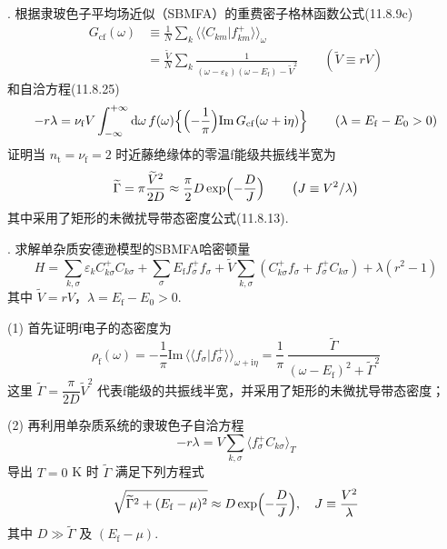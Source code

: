 {.} 根据隶玻色子平均场近似（SBMFA）的重费密子格林函数公式(11.8.9c)
\begin{equation*}
\begin{aligned}
  G_{\mathrm{cf}}(\omega)&\equiv\frac{1}{N}\sum_{k}
  \langle\langle C_{km}|f^{+}_{km}\rangle\rangle_{\omega}\\
  &=\frac{\widetilde{V}}{N}\sum_{k}
  \frac{1}{(\omega-\varepsilon_{k})(\omega-E_{\mathrm{f}})-\widetilde{V}^{2}}
  \qquad\left(\widetilde{V}\equiv rV\right)
\end{aligned}
\end{equation*}
和自洽方程(11.8.25)
\begin{equation*}
  -r\lambda=\nu_{\mathrm{f}}V\int_{-\infty}^{+\infty}\mathrm{d}\omega\,f(\omega)
  \Bigl\{\Bigl(-\frac{1}{\pi}\Bigr)\mathrm{Im}\,G_{\mathrm{cf}}(\omega+\mathrm{i}\eta)\Bigr\}
  \qquad\left(\lambda=E_{\mathrm{f}}-E_{0}>0\right)
\end{equation*}
证明当 $n_{\mathrm{t}}=\nu_{\mathrm{f}}=2$ 时近藤绝缘体的零温f能级共振线半宽为
\begin{equation*}
  \widetilde{\Gamma}=\pi\frac{\widetilde{V}^{2}}{2D}
  \approx\frac{\pi}{2}D\exp\Bigl(-\frac{D}{J}\Bigr)
  \qquad\left(J\equiv V^{2}/\lambda\right)
\end{equation*}
其中采用了矩形的未微扰导带态密度公式(11.8.13).

{.} 求解单杂质安德逊模型的SBMFA哈密顿量
\begin{equation*}
  H=\sum_{k,\sigma}\varepsilon_{k}C^{+}_{k\sigma}C_{k\sigma}
  +\sum_{\sigma}E_{\mathrm{f}}f^{+}_{\sigma}f_{\sigma}
  +\widetilde{V}\sum_{k,\sigma}\left(C^{+}_{k\sigma}f_{\sigma}+f^{+}_{\sigma}C_{k\sigma}\right)
  +\lambda\left(r^{2}-1\right)
\end{equation*}
其中 $\widetilde{V}=rV$，$\lambda=E_{\mathrm{f}}-E_{0}>0$.

(1) 首先证明f电子的态密度为
\begin{equation*}
  \rho_{\mathrm{f}}(\omega)=-\frac{1}{\pi}\mathrm{Im}\,
  \langle\langle f_{\sigma}|f^{+}_{\sigma}\rangle\rangle_{\omega+\mathrm{i}\eta}
  =\frac{1}{\pi}\,\frac{\widetilde{\Gamma}}{(\omega-E_{\mathrm{f}})^{2}+\widetilde{\Gamma}^{2}}
\end{equation*}
这里 $\widetilde{\Gamma}=\dfrac{\pi}{2D}\widetilde{V}^{2}$ 代表f能级的共振线半宽，并采用了矩形的未微扰导带态密度；

(2) 再利用单杂质系统的隶玻色子自洽方程
\begin{equation*}
  -r\lambda=V\sum_{k,\sigma}\bigl\langle f^{+}_{\sigma}C_{k\sigma}\bigr\rangle_{T}
\end{equation*}
导出 $T=0$ K 时 $\widetilde{\Gamma}$ 满足下列方程式
\begin{equation*}
  \sqrt{\widetilde{\Gamma}^{2}+(E_{\mathrm{f}}-\mu)^{2}}
  \approx D\exp\Bigl(-\frac{D}{J}\Bigr),\quad J\equiv\frac{V^{2}}{\lambda}
\end{equation*}
其中 $D\gg\widetilde{\Gamma}$ 及 $(E_{\mathrm{f}}-\mu)$.

